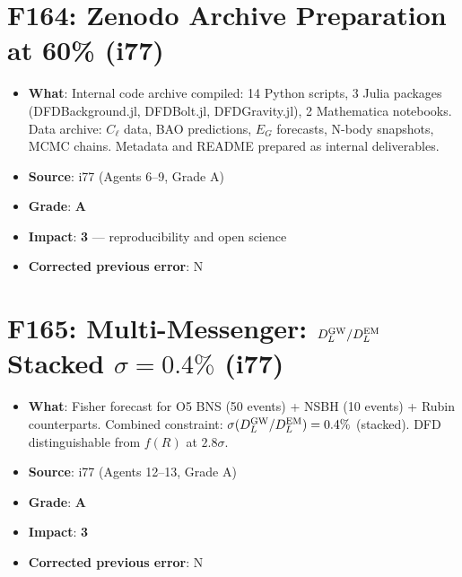 \documentclass[11pt,a4paper]{article}
\newcommand{\grade}[1]{\textbf{#1}}
\newcommand{\impact}[1]{\textbf{#1}}
\begin{document}
\section{F164: Zenodo Archive Preparation at 60\% (i77)}
\begin{itemize}[nosep]
\item \textbf{What}: Internal code archive compiled: 14 Python scripts, 3 Julia packages (DFDBackground.jl, DFDBolt.jl, DFDGravity.jl), 2 Mathematica notebooks. Data archive: $C_\ell$ data, BAO predictions, $E_G$ forecasts, N-body snapshots, MCMC chains. Metadata and README prepared as internal deliverables.
\item \textbf{Source}: i77 (Agents 6--9, Grade A)
\item \textbf{Grade}: \grade{A}
\item \textbf{Impact}: \impact{3} --- reproducibility and open science
\item \textbf{Corrected previous error}: N
\end{itemize}

\section{F165: Multi-Messenger: $D_L^{\rm GW}/D_L^{\rm EM}$ Stacked $\sigma = 0.4\%$ (i77)}
\begin{itemize}[nosep]
\item \textbf{What}: Fisher forecast for O5 BNS (50 events) + NSBH (10 events) + Rubin counterparts. Combined constraint: $\sigma(D_L^{\rm GW}/D_L^{\rm EM}) = 0.4\%$ (stacked). DFD distinguishable from $f(R)$ at $2.8\sigma$.
\item \textbf{Source}: i77 (Agents 12--13, Grade A)
\item \textbf{Grade}: \grade{A}
\item \textbf{Impact}: \impact{3}
\item \textbf{Corrected previous error}: N
\end{itemize}

\end{document}
